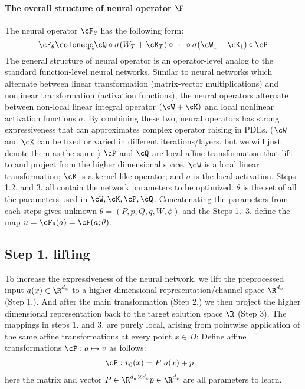\iffalse
\paragraph{The overall structure of neural operator $\F$}
The neural operator $\cF_{\theta}$ has the following form:
\begin{equation}
\label{eq:F}
    \cF_{\theta} \coloneqq \cQ \circ \sigma(W_{T} + \cK_{T}) \circ \cdots \circ \sigma(\cW_1 + \cK_1) \circ \cP
\end{equation}
The general structure of neural operator is an operator-level analog to the standard function-level neural networks. Similar to neural networks which alternate between linear transformation (matrix-vector multiplications) and nonlinear transformation (activation functions), the neural operators alternate between non-local linear integral operator $(\cW + \cK)$ and local nonlinear activation functions $\sigma$. By combining these two, neural operators has strong expressiveness that can approximates complex operator raising in PDEs. ($\cW$ and $\cK$ can be fixed or varied in different iterations/layers, but we will just denote them as the same.)
$\cP$ and $\cQ$ are local affine transformation that lift to and project from the higher dimensional space. $\cW$ is a local linear transformation; $\cK$ is a kernel-like operator; and $\sigma$ is the local activation. Steps 1.2. and 3. all contain the network parameters to be optimized. $\theta$ is the set of all the parameters used in $\cW, \cK, \cP, \cQ$. Concatenating the parameters from each steps gives unknown $\theta=(P,p,Q,q,W,\phi)$ and the Steps 1.--3. define the map $u=\cF_{\theta}(a) = \cF(a;\theta)$.

\subsection{Step 1. lifting }
\label{ssec:step1}
To increase the expressiveness of the neural network, we lift the preprocessed input $a(x) \in \R^{d_a}$ to a higher dimensional representation/channel space $\R^{d_v}$ (Step 1.). And after the main transformation (Step 2.) we then project the higher dimensional representation back to the target solution space $\R$ (Step 3).
The mappings in steps 1. and 3. are purely local, arising from
pointwise application of the same affine transformations at every
point $x \in D$; Define affine transformations $\cP:a \mapsto v$ as follows:
\begin{align*}
\cP:&\ v_0(x)=P\ a(x)+p
\end{align*}
here the matrix and vector $P \in \R^{d_a \times d_v}
p \in \R^{d_v}$ are all parameters to learn.


